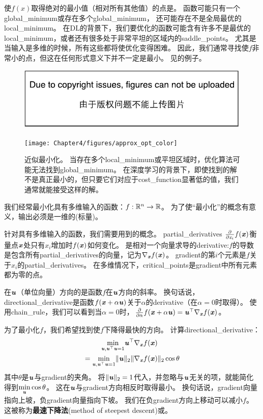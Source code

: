 使$f(x)$取得绝对的最小值（相对所有其他值）的点是。
函数可能只有一个\gls{global_minimum}或存在多个\gls{global_minimum}，
还可能存在不是全局最优的\gls{local_minimum}。
在\gls{DL}的背景下，我们要优化的函数可能含有许多不是最优的\gls{local_minimum}，或者还有很多处于非常平坦的区域内的\gls{saddle_points}。
尤其是当输入是多维的时候，所有这些都将使优化变得困难。
因此，我们通常寻找使$f$非常小的点，但这在任何形式意义下并不一定是最小。
见的例子。
\begin{figure}[!htb]
\ifOpenSource
\centerline{\includegraphics{figure.pdf}}
\else
\centerline{\texttt{[image: Chapter4/figures/approx\_opt\_color]}}
\fi
\caption{近似最小化。 
当存在多个\gls{local_minimum}或平坦区域时，优化算法可能无法找到\gls{global_minimum}。
在深度学习的背景下，即使找到的解不是真正最小的，但只要它们对应于\gls{cost_function}显著低的值，我们通常就能接受这样的解。
}
\label{fig:chap4_approx_opt_color}
\end{figure}

我们经常最小化具有多维输入的函数：$f: \mathbb{R}^n \rightarrow \mathbb{R} $。 
为了使``最小化''的概念有意义，输出必须是一维的(标量)。


针对具有多维输入的函数，我们需要用到的概念。
\gls{partial_derivatives} $\frac{\partial}{\partial \mathit{x}_i}f(\boldsymbol{\mathit{x}})$衡量点$\boldsymbol{\mathit{x}}$处只有$x_i$增加时$f(\boldsymbol{\mathit{x}})$如何变化。
是相对一个向量求导的\gls{derivative}:$f$的导数是包含所有\gls{partial_derivatives}的向量，记为$\nabla_{\boldsymbol{\mathit{x}}} f(\boldsymbol{\mathit{x}})$。
\gls{gradient}的第$i$个元素是$f$关于$x_i$的\gls{partial_derivatives}。
在多维情况下，\gls{critical_points}是\gls{gradient}中所有元素都为零的点。

在$\boldsymbol{\mathit{u}}$（单位向量）方向的是函数$f$在$\boldsymbol{\mathit{u}}$方向的斜率。
换句话说，\gls{directional_derivative}是函数$f(\boldsymbol{\mathit{x}} + \alpha \boldsymbol{\mathit{u}})$关于$\alpha$的\gls{derivative}（在$\alpha = 0$时取得）。
使用\gls{chain_rule}，我们可以看到当$\alpha=0$时，$\frac{\partial}{\partial \alpha} f(\boldsymbol{\mathit{x}} + \alpha \boldsymbol{\mathit{u}}) = \boldsymbol{\mathit{u}}^\top \nabla_{\boldsymbol{\mathit{x}}} f(\boldsymbol{\mathit{x}})$。

为了最小化$f$，我们希望找到使$f$下降得最快的方向。
计算\gls{directional_derivative}：
\begin{align}
 \underset{\boldsymbol{\mathit{u}}, \boldsymbol{\mathit{u}}^\top\boldsymbol{\mathit{u}} = 1}{\min} \boldsymbol{\mathit{u}}^\top & \nabla_{\boldsymbol{\mathit{x}}} f(\boldsymbol{\mathit{x}}) \\
 = \underset{\boldsymbol{\mathit{u}}, \boldsymbol{\mathit{u}}^\top\boldsymbol{\mathit{u}} = 1}{\min} \| \boldsymbol{\mathit{u}} \|_2 \| &\nabla_{\boldsymbol{\mathit{x}}}f(\boldsymbol{\mathit{x}}) \|_2 \cos \theta
\end{align}
其中$\theta$是$\boldsymbol{\mathit{u}}$与\gls{gradient}的夹角。
将$ \| \boldsymbol{\mathit{u}} \|_2 = 1$代入，并忽略与$\boldsymbol{\mathit{u}}$无关的项，就能简化得到$ \underset{\boldsymbol{\mathit{u}}}{\min} \cos \theta $。 
这在$\boldsymbol{\mathit{u}}$与\gls{gradient}方向相反时取得最小。
换句话说，\gls{gradient}向量指向上坡，负\gls{gradient}向量指向下坡。
我们在负\gls{gradient}方向上移动可以减小$f$。
这被称为\textbf{最速下降法}(method of steepest descent)或。

